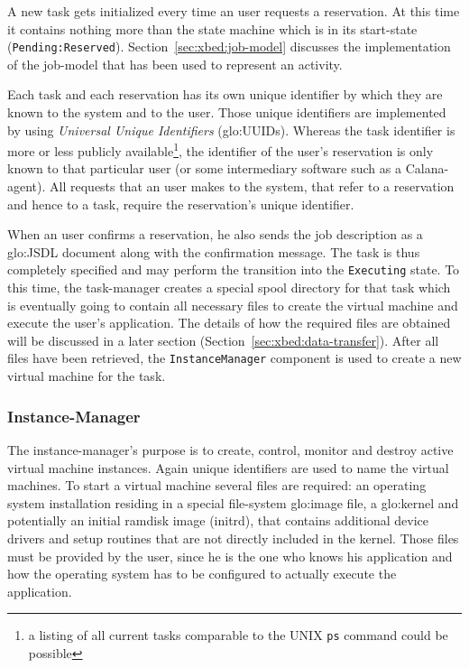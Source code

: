 A new task gets initialized every  time an user requests a reservation. At
this time it contains nothing more  than the state machine which is in its
start-state                               (\ie \texttt{Pending:Reserved}).
Section~\ref{sec:xbed:job-model}  discusses   the  implementation  of  the
job-model that has been used to  represent an activity.

Each task and each reservation has its own unique identifier by which they
are known  to the system  and to the  user.  Those unique  identifiers are
implemented     by    using     \emph{Universal     Unique    Identifiers}
(\gls{glo:UUID}s).  Whereas  the task identifier is more  or less publicly
available\footnote{a listing  of all current tasks comparable  to the UNIX
  \texttt{ps}  command could be  possible}, the  identifier of  the user's
reservation is  only known to  that particular user (or  some intermediary
software such as  a Calana-agent). All requests that an  user makes to the
system,  that refer  to a  reservation and  hence to  a task,  require the
reservation's unique identifier.

When an user confirms a reservation,  he also sends the job description as
a \gls{glo:JSDL}  document along with the confirmation  message.  The task
is  thus completely  specified and  may  perform the  transition into  the
\texttt{Executing} state. To this time, the task-manager creates a special
spool directory  for that  task which is  eventually going to  contain all
necessary  files to  create the  virtual  machine and  execute the  user's
application. The  details of how the  required files are  obtained will be
discussed  in   a  later  section  (Section~\ref{sec:xbed:data-transfer}).
After  all   files  have  been   retrieved,  the  \texttt{InstanceManager}
component is used to create a new virtual machine for the task.

\subsubsection{Instance-Manager}

The instance-manager's purpose is  to create, control, monitor and destroy
active virtual  machine instances.  Again  unique identifiers are  used to
name the  virtual machines. To start  a virtual machine  several files are
required:  an   operating  system  installation  residing   in  a  special
file-system  \gls{glo:image} file, a  \gls{glo:kernel} and  potentially an
initial ramdisk  image (initrd),  that contains additional  device drivers
and setup  routines that  are not directly  included in the  kernel. Those
files must  be provided by  the user,  since he is  the one who  knows his
application and how the operating  system has to be configured to actually
execute the application.

